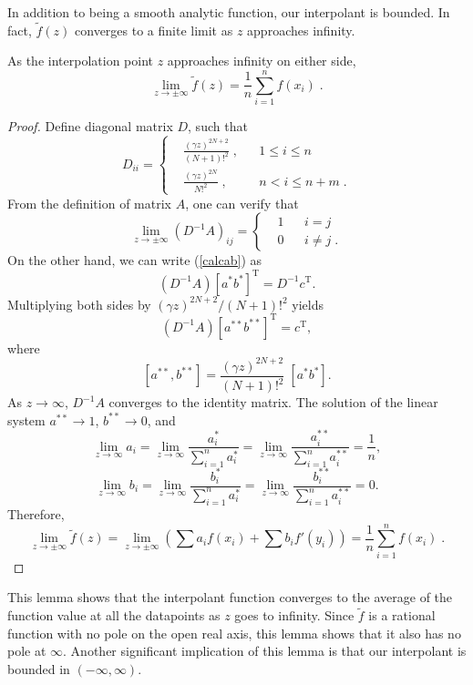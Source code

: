 In addition to being a smooth analytic function, our interpolant
is bounded.  In fact,
${\tilde f}(z)$ converges to a finite limit as $z$ approaches infinity.
\begin{proposition} \label{prop_limit}
As the interpolation point $z$ approaches infinity on either side,
\[ \lim_{z\to\pm\infty} {\tilde f}(z) = \frac{1}{n}\sum_{i=1}^n f(x_i) \;. \]
\end{proposition}
\begin{proof}
Define diagonal matrix $D$, such that
\[ D_{ii} = \left\{ \begin{aligned}
            & \frac{(\gamma z)^{2N+2}}{(N+1)!^2}\;, && 1\le i\le n \\
            & \frac{(\gamma z)^{2N}}{N!^2}\;, && n< i \le n+m  \;.\end{aligned}
            \right.\]
From the definition of matrix $A$, one can verify that
\[ \lim_{z\to\pm\infty} \left( D^{-1} A \right)_{ij} = \left\{
   \begin{aligned} & 1 && i = j \\ & 0 && i\ne j \;. \end{aligned} \right.\]
On the other hand, we can write (\ref{calcab}) as
\[ \left(D^{-1} A \right) [a^*b^*]^{\mathrm T}
 = D^{-1} c^{\mathrm T} . \]
Multiplying both sides by $(\gamma z)^{2N+2} / (N+1)!^2$ yields
\[ \left(D^{-1} A\right) [a^{**}b^{**}]^{\mathrm T}
 = c^{\mathrm T} ,\]
where
\[ [a^{**},b^{**}] = \frac{(\gamma z)^{2N+2}}{(N+1)!^2}\; [a^*b^*] .\]
As $z\to\infty$, $D^{-1} A$ converges to the identity matrix.  The solution of
 the linear system $a^{**} \to 1$, $b^{**} \to 0$, and
\[ \lim_{z\to\infty} a_i
 = \lim_{z\to\infty} \frac{a_i^*}{\displaystyle\sum_{i=1}^n a^*_i}
 = \lim_{z\to\infty} \frac{a_i^{**}}{\displaystyle\sum_{i=1}^n a^{**}_i}
 = \frac1n , \]
\[ \lim_{z\to\infty} b_i
 = \lim_{z\to\infty} \frac{b_i^*}{\displaystyle\sum_{i=1}^n a^*_i}
 = \lim_{z\to\infty} \frac{b_i^{**}}{\displaystyle\sum_{i=1}^n a^{**}_i}
 = 0 . \]
Therefore,
\[ \lim_{z\to\pm\infty} {\tilde f}(z)
 = \lim_{z\to\pm\infty} \left(\sum a_i f(x_i) + \sum b_i f'(y_i)\right)
 = \frac{1}{n}\sum_{i=1}^n f(x_i) \;.\]
\end{proof}
This lemma shows that the interpolant function converges to the average
of the function value at all the datapoints as $z$ goes to infinity.
Since $\tilde f$ is a rational function with no pole on the open real axis,
this lemma shows that it also has no pole at $\infty$.  Another
significant implication of this lemma is that our interpolant is
bounded in $(-\infty, \infty)$.

